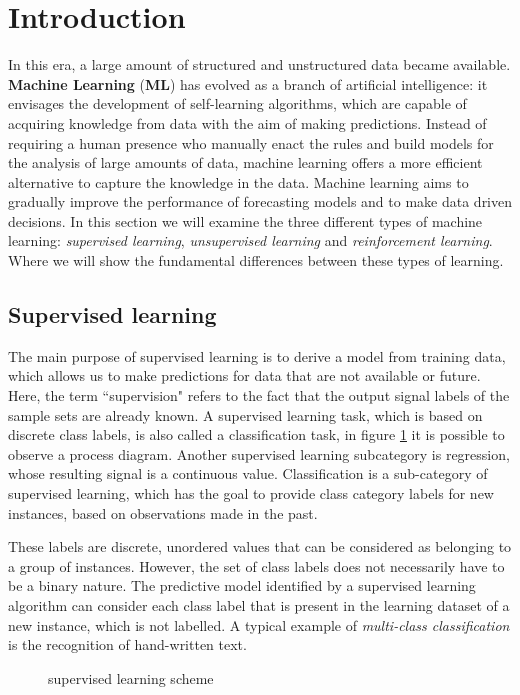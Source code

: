 \section{Introduction}
\label{sec:intro}
In this era, a large amount of structured and unstructured data became
available. \textbf{Machine Learning} (\textbf{ML}) has evolved as a branch of
artificial intelligence: it envisages the development of self-learning
algorithms, which are capable of acquiring knowledge from data with the aim of
making predictions. Instead of requiring a human presence who manually enact the
rules and build models for the analysis of large amounts of data, machine
learning offers a more efficient alternative to capture the knowledge in the
data. Machine learning aims to gradually improve the performance of forecasting
models and to make data driven decisions. In this section we will examine the
three different types of machine learning: \emph{supervised learning},
\emph{unsupervised learning} and \emph{reinforcement learning}. Where we will
show the fundamental differences between these types of
learning.\cite{raschka2016machine}
%
\subsection{Supervised learning}
\label{subsec:supervised-learnig}
The main purpose of supervised learning is to derive a model from  training
data, which allows us to make predictions for data that are not available or
future. Here, the term ``supervision" refers to the fact that the output signal
labels  of the sample sets are already known. A supervised learning task, which
is based on discrete class labels, is also  called a classification task, in
figure \ref{fig:supervised-learning-scheme} it  is possible to observe a process
diagram. Another supervised learning subcategory is regression, whose resulting
signal is a continuous value. Classification is a sub-category of supervised
learning, which has the goal to provide class category labels for new instances,
based on observations made in the past.

These labels are discrete, unordered values that can be considered as belonging
to a group of instances. However, the set of class labels does not necessarily
have to be a binary nature. The predictive model identified by a supervised
learning algorithm can consider each class label that is present in the learning
dataset of a new instance, which is not labelled. A typical example of
\emph{multi-class classification} is the recognition of hand-written
text.\cite{raschka2016machine}
%
\begin{figure}[!h]
\centering
\resizebox{0.65\textwidth}{!}{}
\caption{supervised learning scheme} 
\label{fig:supervised-learning-scheme}
\end{figure}
%
